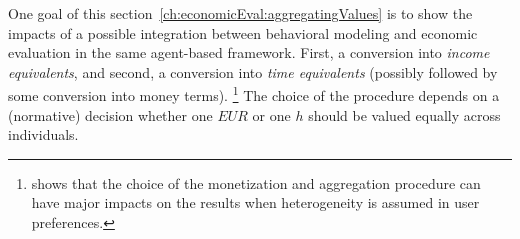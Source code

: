 One goal of this section~\ref{ch:economicEval:aggregatingValues} is to show the impacts of a possible integration between behavioral modeling and economic evaluation in the same agent-based framework. 
%
%
%
%
First, a conversion into \emph{income equivalents}, and second, a conversion into \emph{time equivalents} (possibly followed by some conversion into money terms).%
%
\footnote{
%
\citet{Kickhoefer_PhDThesis_2014} shows that the choice of the monetization and aggregation procedure can have major impacts on the results when heterogeneity is assumed in user preferences.
%
}
%
The choice of the procedure depends on a (normative) decision whether one $\mathit{EUR}$ or one $h$ should be valued equally across individuals.

